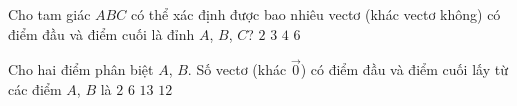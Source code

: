 \begin{ex}%
	Cho tam giác $ ABC $ có thể xác định được bao nhiêu vectơ (khác vectơ không) có điểm đầu và điểm cuối là đỉnh $ A $, $ B $, $ C $?
	\choice
	{$ 2 $}
	{$ 3 $}
	{$ 4 $}
	{\True $ 6 $}
\end{ex}


\begin{ex}%
	Cho hai điểm phân biệt $ A $, $ B $. Số vectơ (khác $ \overrightarrow{0} $) có điểm đầu và điểm cuối lấy từ các điểm $ A $, $ B $ là
	\choice
	{\True $ 2 $}
	{$ 6 $}
	{$ 13 $}
	{$ 12 $}
\end{ex}










